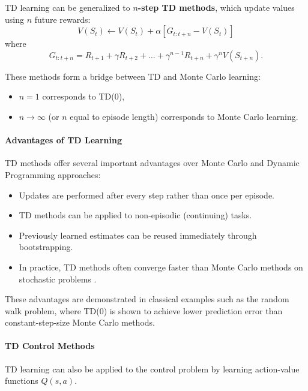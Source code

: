 TD learning can be generalized to \textbf{$n$-step TD methods}, which update values using $n$ future rewards:
\[
V(S_t) \leftarrow V(S_t) + \alpha \left[ G_{t:t+n} - V(S_t) \right]
\]
where
\[
G_{t:t+n} = R_{t+1} + \gamma R_{t+2} + \dots + \gamma^{n-1} R_{t+n} + \gamma^n V(S_{t+n}).
\]





These methods form a bridge between TD and Monte Carlo learning:
\begin{itemize}
\item $n = 1$ corresponds to TD(0),
\item $n \to \infty$ (or $n$ equal to episode length) corresponds to Monte Carlo learning.
\end{itemize}







\paragraph{Advantages of TD Learning}

TD methods offer several important advantages over Monte Carlo and Dynamic Programming approaches:
\begin{itemize}
\item Updates are performed after every step rather than once per episode.
\item TD methods can be applied to non-episodic (continuing) tasks.
\item Previously learned estimates can be reused immediately through bootstrapping.
\item In practice, TD methods often converge faster than Monte Carlo methods on stochastic problems \cite{sutton}.
\end{itemize}

These advantages are demonstrated in classical examples such as the random walk problem, where TD(0) is shown to achieve lower prediction error than constant-step-size Monte Carlo methods.





\paragraph{TD Control Methods}

TD learning can also be applied to the control problem by learning action-value functions $Q(s,a)$.

